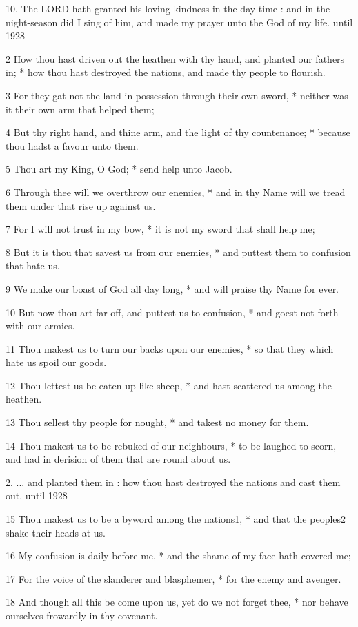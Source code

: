10. The LORD hath granted
his loving-kindness in the day-time : and in the night-season did I sing
of him, and made my prayer unto the God of my life. until
1928

2 How thou hast driven out the heathen with thy hand,
and planted our fathers in; * how thou hast destroyed the nations, and made
thy people to flourish.

3 For they gat not the land in possession through their
own sword, * neither was it their own arm that helped them;

4 But thy right hand, and thine arm, and the light of
thy countenance; * because thou hadst a favour unto them.

5 Thou art my King, O God; * send help unto Jacob.

6 Through thee will we overthrow our enemies, * and in
thy Name will we tread them under that rise up against us.

7 For I will not trust in my bow, * it is not my sword
that shall help me;

8 But it is thou that savest us from our enemies, * and
puttest them to confusion that hate us.

9 We make our boast of God all day long, * and will praise
thy Name for ever.

10 But now thou art far off, and puttest us to confusion,
* and goest not forth with our armies.

11 Thou makest us to turn our backs upon our enemies,
* so that they which hate us spoil our goods.

12 Thou lettest us be eaten up like sheep, * and hast
scattered us among the heathen.

13 Thou sellest thy people for nought, * and takest no
money for them.

14 Thou makest us to be rebuked of our neighbours, *
to be laughed to scorn, and had in derision of them that are round about
us.

2. ... and planted them in
: how thou hast destroyed the nations and cast them out. until
1928

15 Thou makest us to be a byword among the nations1,
* and that the peoples2 shake their heads at us.

16 My confusion is daily before me, * and the shame
of my face hath covered me;

17 For the voice of the slanderer and blasphemer, *
for the enemy and avenger.

18 And though all this be come upon us, yet do we not
forget thee, * nor behave ourselves frowardly in thy covenant.


